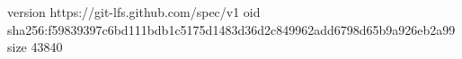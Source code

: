 version https://git-lfs.github.com/spec/v1
oid sha256:f59839397c6bd111bdb1c5175d1483d36d2c849962add6798d65b9a926eb2a99
size 43840
